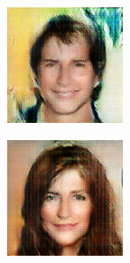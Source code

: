 \documentclass{article}
\begin{document}
\begin{center}
\begin{minipage}{0.24\linewidth}
\end{minipage}
\begin{minipage}{0.24\linewidth}
\includegraphics[width=\textwidth]{samples_16_185.png}
\end{minipage}
\begin{minipage}{0.24\linewidth}
\includegraphics[width=\textwidth]{samples_16_435.png}
\end{minipage}
\end{center}
\end{document}
